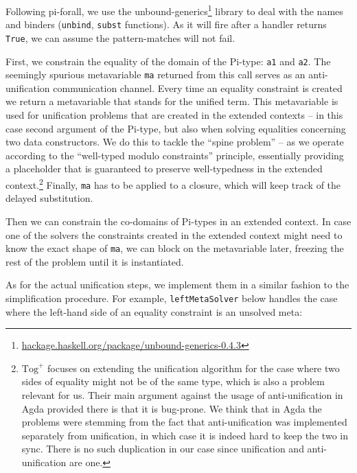 Following pi-forall, we use the unbound-generics\footnote{\href{https://hackage.haskell.org/package/unbound-generics-0.4.3}{hackage.haskell.org/package/unbound-generics-0.4.3}}
library to deal with the names and binders (\texttt{unbind},
\texttt{subst} functions). As it will fire after a handler returns
\texttt{True}, we can assume the pattern-matches will not fail.

First, we constrain the equality of the domain of the Pi-type:
\texttt{a1} and \texttt{a2}. The seemingly spurious metavariable
\texttt{ma} returned from this call serves as an anti-unification
\citep{pfenningUnificationAntiunificationCalculus1991} communication
channel. Every time an equality constraint is created we return a
metavariable that stands for the unified term. This metavariable is used
for unification problems that are created in the extended contexts -- in
this case second argument of the Pi-type, but also when solving
equalities concerning two data constructors. We do this to tackle the
``spine problem''
\citep[sec.~1.4]{victorlopezjuanPracticalHeterogeneousUnification2021}
-- as we operate according to the ``well-typed modulo constraints''
principle, essentially providing a placeholder that is guaranteed to
preserve well-typedness in the extended context.\footnote{\(\text{Tog}^{+}\)
  \citep{victorlopezjuanTog2020, victorlopezjuanPracticalHeterogeneousUnification2021}
  focuses on extending the unification algorithm for the case where two
  sides of equality might not be of the same type, which is also a
  problem relevant for us. Their main argument against the usage of
  anti-unification in Agda provided there is that it is bug-prone. We
  think that in Agda the problems were stemming from the fact that
  anti-unification was implemented separately from unification, in which
  case it is indeed hard to keep the two in sync. There is no such
  duplication in our case since unification and anti-unification are
  one.} Finally, \texttt{ma} has to be applied to a closure, which will
keep track of the delayed substitution.

Then we can constrain the co-domains of Pi-types in an extended context.
In case one of the solvers the constraints created in the extended
context might need to know the exact shape of \texttt{ma}, we can block
on the metavariable later, freezing the rest of the problem until it is
instantiated.

As for the actual unification steps, we implement them in a similar
fashion to the simplification procedure. For example,
\texttt{leftMetaSolver} below handles the case where the left-hand side
of an equality constraint is an unsolved meta:

